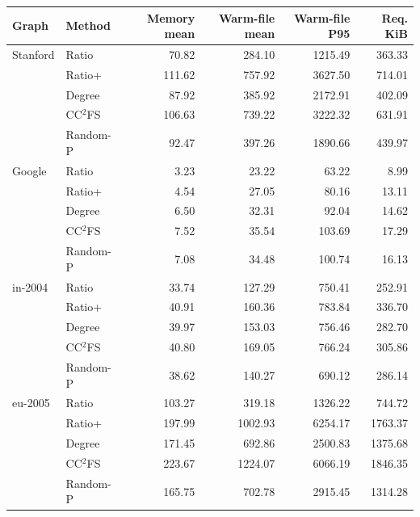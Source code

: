 \begin{tabular}{@{}llrrrr@{}}
\toprule
Graph & Method & Memory mean & Warm-file mean & Warm-file P95 & Req. KiB \\
\midrule
Stanford & Ratio & 70.82 & 284.10 & 1215.49 & 363.33 \\
 & Ratio+ & 111.62 & 757.92 & 3627.50 & 714.01 \\
 & Degree & 87.92 & 385.92 & 2172.91 & 402.09 \\
 & CC$^2$FS & 106.63 & 739.22 & 3222.32 & 631.91 \\
 & Random-P & 92.47 & 397.26 & 1890.66 & 439.97 \\
\midrule
Google & Ratio & 3.23 & 23.22 & 63.22 & 8.99 \\
 & Ratio+ & 4.54 & 27.05 & 80.16 & 13.11 \\
 & Degree & 6.50 & 32.31 & 92.04 & 14.62 \\
 & CC$^2$FS & 7.52 & 35.54 & 103.69 & 17.29 \\
 & Random-P & 7.08 & 34.48 & 100.74 & 16.13 \\
\midrule
in-2004 & Ratio & 33.74 & 127.29 & 750.41 & 252.91 \\
 & Ratio+ & 40.91 & 160.36 & 783.84 & 336.70 \\
 & Degree & 39.97 & 153.03 & 756.46 & 282.70 \\
 & CC$^2$FS & 40.80 & 169.05 & 766.24 & 305.86 \\
 & Random-P & 38.62 & 140.27 & 690.12 & 286.14 \\
\midrule
eu-2005 & Ratio & 103.27 & 319.18 & 1326.22 & 744.72 \\
 & Ratio+ & 197.99 & 1002.93 & 6254.17 & 1763.37 \\
 & Degree & 171.45 & 692.86 & 2500.83 & 1375.68 \\
 & CC$^2$FS & 223.67 & 1224.07 & 6066.19 & 1846.35 \\
 & Random-P & 165.75 & 702.78 & 2915.45 & 1314.28 \\
\bottomrule
\end{tabular}
